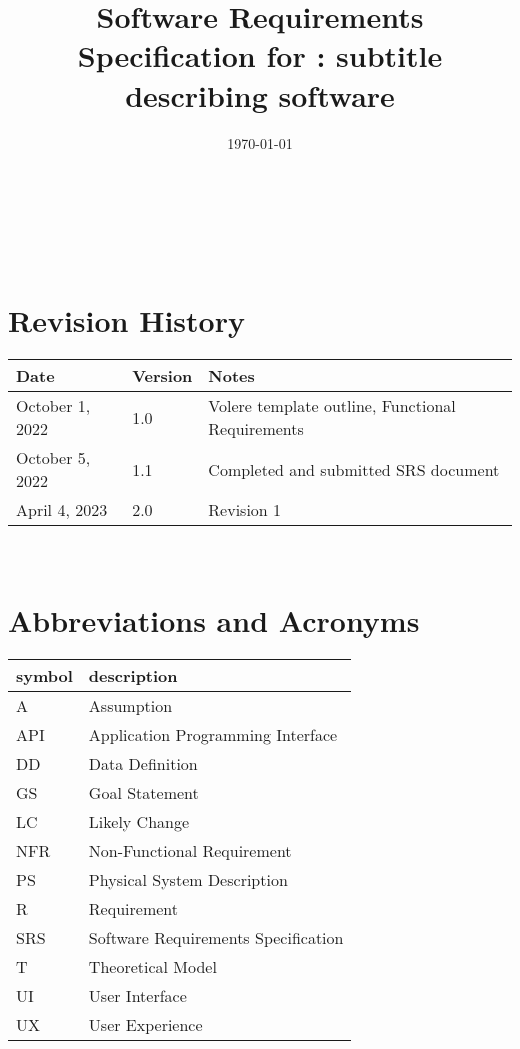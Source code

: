 \documentclass[12pt]{article}
\begin{document}
\title{Software Requirements Specification for \progname: subtitle describing software} 
\author{\authname}
\date{\today}
	
\maketitle

~\newpage


\tableofcontents

~\newpage

\section*{Revision History}

\begin{tabularx}{\textwidth}{p{3cm}p{2cm}X}
\toprule {\bf Date} & {\bf Version} & {\bf Notes}\\
\midrule
October 1, 2022 & 1.0 & Volere template outline, Functional Requirements\\
October 5, 2022 & 1.1 & Completed and submitted SRS document\\
April 4, 2023 & 2.0 & Revision 1
\bottomrule
\end{tabularx}

~\newpage
\section{Abbreviations and Acronyms}
\begin{tabular}{l l} 
	\toprule		
	\textbf{symbol} & \textbf{description}\\
	\midrule 
	A & Assumption\\
	API & Application Programming Interface\\
	DD & Data Definition\\
	GS & Goal Statement\\
	LC & Likely Change\\
	NFR & Non-Functional Requirement\\
	PS & Physical System Description\\
	R & Requirement\\
	SRS & Software Requirements Specification\\
	T & Theoretical Model\\
	UI & User Interface\\
	UX & User Experience\\
	\bottomrule
\end{tabular}\\
\end{document}
